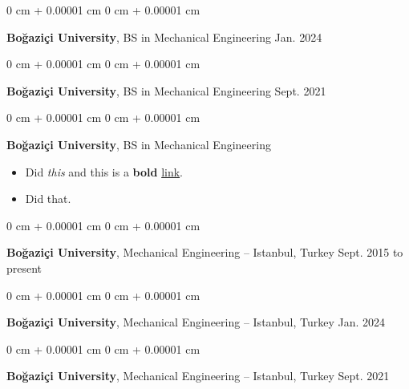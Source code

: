 \documentclass[10pt, letterpaper]{article}
\newenvironment{highlights}{
    \begin{itemize}[
        topsep=0.10 cm,
        parsep=0.10 cm,
        partopsep=0pt,
        itemsep=0pt,
        leftmargin=0 cm + 10pt
    ]
}{
    \end{itemize}
        
    \vspace{-0.20cm}
} %
\newenvironment{onecolentry}{
    \begin{adjustwidth}{
        0 cm + 0.00001 cm
    }{
        0 cm + 0.00001 cm
    }
}{
    \end{adjustwidth}
} %
\begin{document}
        \begin{onecolentry}
            \textbf{Boğaziçi University}, BS in Mechanical Engineering \hfill Jan. 2024
        \end{onecolentry}

        \vspace{0.1 cm}

        \begin{onecolentry}
            \textbf{Boğaziçi University}, BS in Mechanical Engineering \hfill Sept. 2021
        \end{onecolentry}

        \vspace{0.1 cm}

        \begin{onecolentry}
            \textbf{Boğaziçi University}, BS in Mechanical Engineering \hfill 
            \begin{highlights}
                \item Did \textit{this} and this is a \textbf{bold} \href{https://example.com}{link}.
                \item Did that.
            \end{highlights}
        \end{onecolentry}

        \vspace{0.1 cm}

        \begin{onecolentry}
            \textbf{Boğaziçi University}, Mechanical Engineering -- Istanbul, Turkey \hfill Sept. 2015 to present
        \end{onecolentry}

        \vspace{0.1 cm}

        \begin{onecolentry}
            \textbf{Boğaziçi University}, Mechanical Engineering -- Istanbul, Turkey \hfill Jan. 2024
        \end{onecolentry}

        \vspace{0.1 cm}

        \begin{onecolentry}
            \textbf{Boğaziçi University}, Mechanical Engineering -- Istanbul, Turkey \hfill Sept. 2021
        \end{onecolentry}

        \vspace{0.1 cm}
\end{document}
